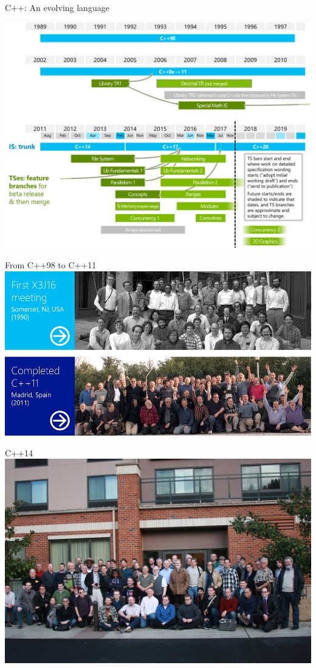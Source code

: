 \begin{frame}[t]{C++: An evolving language}
\begin{center}
\includegraphics[height=.85\textheight]{img/wg21-timeline.png}
\end{center}
\end{frame}

\begin{frame}[t]{From C++98 to C++11}
\includegraphics[width=\textwidth]{img/wg21-1990-2011.png}
\end{frame}

\begin{frame}[t]{C++14}
\includegraphics[width=\textwidth]{img/cpp-14.jpg}
\end{frame}

